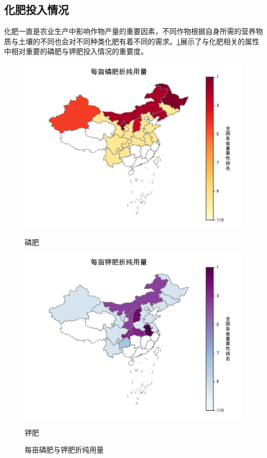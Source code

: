 \subsection{化肥投入情况}
化肥一直是农业生产中影响作物产量的重要因素，不同作物根据自身所需的营养物质与土壤的不同也会对不同种类化肥有着不同的需求。\ref{fig:fertilizer_PN}展示了与化肥相关的属性中相对重要的磷肥与钾肥投入情况的重要度。
  \begin{figure}[htb]
    \centering
    \begin{minipage}[t]{0.49\linewidth}
      \centering
      \includegraphics[width=\linewidth]{figs/NPK_P}
      \caption{磷肥}
      \label{fig:fertilizer_P}
    \end{minipage}
    \hfill
    \begin{minipage}[t]{0.49\linewidth}
      \centering
      \includegraphics[width=\linewidth]{figs/NPK_K}
      \caption{钾肥}
      \label{fig:fertilizer_K}
    \end{minipage}
    \caption{每亩磷肥与钾肥折纯用量}
    \label{fig:fertilizer_PN}
  \end{figure}

